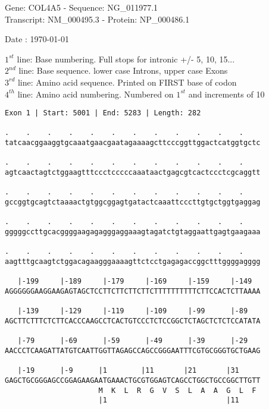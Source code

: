 \documentclass{article}
\begin{document}
\begin{center}
\begin{large}
Gene: COL4A5 - Sequence: NG\_011977.1\\
Transcript: NM\_000495.3 - Protein: NP\_000486.1
 
 Date : \today
\end{large}
\end{center}
$1^{st}$ line: Base numbering. Full stops for intronic +/- 5, 10, 15...\\
$2^{nd}$ line: Base sequence. lower case Introns, upper case Exons\\
$3^{rd}$ line: Amino acid sequence. Printed on FIRST base of codon\\
$4^{th}$ line: Amino acid numbering. Numbered on $1^{st}$ and increments of 10\\
\begin{Verbatim}
Exon 1 | Start: 5001 | End: 5283 | Length: 282
 
.    .    .    .    .    .    .    .    .    .    .    .    
tatcaacggaaggtgcaaatgaacgaatagaaaagcttcccggttggactcatggtgctc
  
.    .    .    .    .    .    .    .    .    .    .    .    
agtcaactagtctggaagtttccctcccccaaataactgagcgtcactccctcgcaggtt
  
.    .    .    .    .    .    .    .    .    .    .    .    
gccggtgcagtctaaaactgtggcggagtgatactcaaattcccttgtgctggtgaggag
  
.    .    .    .    .    .    .    .    .    .    .    .    
gggggccttgcacggggaagagagggaggaaagtagatctgtaggaattgagtgaagaaa
  
.    .    .    .    .    .    .    .    .    .    .    .    
aagtttgcaagtctggacagaagggaaaagttctcctgagagaccggctttggggagggg
  
   |-199     |-189     |-179     |-169     |-159     |-149  
AGGGGGGAAGGAAGAGTAGCTCCTTCTTCTTCTTCTTTTTTTTTTCTTCCACTCTTAAAA
  
   |-139     |-129     |-119     |-109     |-99      |-89   
AGCTTCTTTCTCTTCACCCAAGCCTCACTGTCCCTCTCCGGCTCTAGCTCTCTCCATATA
  
   |-79      |-69      |-59      |-49      |-39      |-29   
AACCCTCAAGATTATGTCAATTGGTTAGAGCCAGCCGGGAATTTCGTGCGGGTGCTGAAG
  
   |-19      |-9      |1        |11       |21       |31     
GAGCTGCGGGAGCCGGAGAAGAATGAAACTGCGTGGAGTCAGCCTGGCTGCCGGCTTGTT
                      M  K  L  R  G  V  S  L  A  A  G  L  F 
                      |1                            |11     
  

\end{Verbatim}
\end{document}
